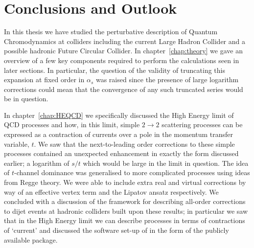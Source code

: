 
\chapter{Conclusions and Outlook}
\label{chap:conclusion}

In this thesis we have studied the perturbative description of Quantum Chromodynamics at colliders
including the current Large Hadron Collider and a possible hadronic Future Circular Collider.  In
chapter~\ref{chap:theory} we gave an overview of a few key components required to perform the
calculations seen in later sections.  In particular, the question of the validity of truncating
this expansion at fixed order in $\alpha_s$ was raised since the presence of large logarithm
corrections could mean that the convergence of any such truncated series would be in question.

In chapter~\ref{chap:HEQCD} we specifically discussed the High Energy limit of QCD processes and
how, in this limit, simple $2\to2$ scattering processes can be expressed as a contraction of currents
over a pole in the momentum transfer variable, $t$.  We saw that the next-to-leading order corrections
to these simple processes contained an unexpected enhancement in exactly the form discussed earlier;
a logarithm of $s/t$ which would be large in the limit in question.  The idea of $t$-channel dominance
was generalised to more complicated processes using ideas from Regge theory.  We were able to include
extra real and virtual corrections by way of an effective vertex term and the Lipatov ansatz respectively.
We concluded with a discussion of the \hej framework for describing all-order corrections to dijet events
at hadronic colliders built upon these results; in particular we saw that in the High Energy limit we can describe processes in terms
of contractions of `current' and discussed the software set-up of \hej in the form of the publicly
available \HEJ package.

